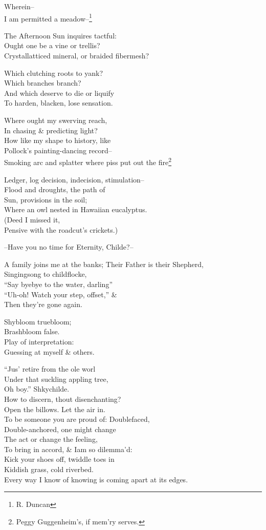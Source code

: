 \secdiv

Wherein-- \\
I am permitted a meadow--\footnote{R. Duncan}

The Afternoon Sun inquires tactful: \\
Ought one be a vine or trellis? \\
Crystallatticed mineral, or braided fibermesh?

Which clutching roots to yank? \\
Which branches branch? \\
And which deserve to die or liquify \\
To harden, blacken, lose sensation.

Where ought my swerving reach, \\
In chasing \& predicting light? \\
How like my shape to history, like \\
Pollock's painting-dancing record-- \\
Smoking arc and splatter where piss put out the fire\footnote{Peggy Guggenheim's, if mem'ry serves.} 

Ledger, log decision, indecision, stimulation-- \\
Flood and droughts, the path of \\
Sun, provisions in the soil; \\
Where an owl nested in Hawaiian eucalyptus. \\
(Deed I missed it, \\
Pensive with the roadcut's crickets.)

\secdiv

--Have you no time for Eternity, Childe?--

A family joins me at the banks;
Their Father is their Shepherd, \\
Singingsong to childflocke, \\
``Say byebye to the water, darling''\\
``Uh-oh! Watch your step, offset,'' \& \\
Then they're gone again.

Shybloom truebloom; \\
Brashbloom false. \\
Play of interpretation: \\
Guessing at myself \& others.

``Jus' retire from the ole worl \\
Under that suckling appling tree, \\
Oh boy.'' Shkychilde. \\ 
How to discern, thout disenchanting? \\
Open the billows. Let the air in. \\
To be someone you are proud of: Doublefaced, \\
Double-anchored, one might change \\
The act or change the feeling, \\
To bring in accord, \& Iam so dilemma'd: \\
Kick your shoes off, twiddle toes in \\
Kiddish grass, cold riverbed. \\
Every way I know of knowing is coming apart at its edges.

